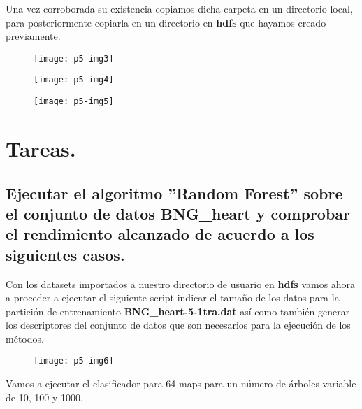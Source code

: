 \documentclass[10pt]{article}
\begin{document}
Una vez corroborada su existencia copiamos dicha carpeta en un directorio local, para posteriormente copiarla en un directorio en \textbf{hdfs} que hayamos creado previamente. \\

 \begin{figure}[H]
	\begin{center}
 		\texttt{[image: p5-img3]}
	\end{center} 
\end{figure}

 \begin{figure}[H]
	\begin{center}
 		\texttt{[image: p5-img4]}
	\end{center} 
\end{figure}

 \begin{figure}[H]
	\begin{center}
 		\texttt{[image: p5-img5]}
	\end{center} 
\end{figure}

\section{Tareas.}
\subsection{Ejecutar el algoritmo ''Random Forest'' sobre el conjunto de datos BNG\_heart y comprobar el rendimiento alcanzado de acuerdo a los siguientes casos.}
Con los datasets importados a nuestro directorio de usuario en \textbf{hdfs} vamos ahora a proceder a ejecutar el siguiente script 
indicar el tamaño de los datos para la partición de entrenamiento \textbf{BNG\_heart-5-1tra.dat} así como también generar los descriptores del conjunto de datos que son necesarios para la ejecución de los métodos. \\

 \begin{figure}[H]
	\begin{center}
 		\texttt{[image: p5-img6]}
	\end{center} 
\end{figure}

Vamos a ejecutar el clasificador para 64 maps para un número de árboles variable de 10, 100 y 1000. \\



 
\end{document}
